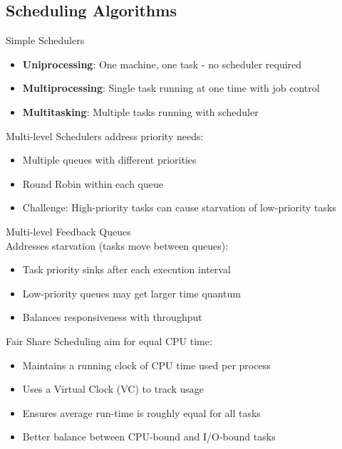\multend

\subsection{Scheduling Algorithms}


\begin{definition}{Simple Schedulers}
    \begin{itemize}
        \item \textbf{Uniprocessing}: One machine, one task - no scheduler required
        \item \textbf{Multiprocessing}: Single task running at one time with job control
        \item \textbf{Multitasking}: Multiple tasks running with scheduler
    \end{itemize}
\end{definition}

\begin{concept}{Multi-level Schedulers} address priority needs:
    \begin{itemize}
        \item Multiple queues with different priorities
        \item Round Robin within each queue
        \item Challenge: High-priority tasks can cause starvation of low-priority tasks
    \end{itemize}
\end{concept}

\begin{concept}{Multi-level Feedback Queues} \\
    Addresses starvation (tasks move between queues):
    \begin{itemize}
        \item Task priority sinks after each execution interval
        \item Low-priority queues may get larger time quantum
        \item Balances responsiveness with throughput
    \end{itemize}
\end{concept}

\begin{concept}{Fair Share Scheduling} aim for equal CPU time:
    \begin{itemize}
        \item Maintains a running clock of CPU time used per process
        \item Uses a Virtual Clock (VC) to track usage
        \item Ensures average run-time is roughly equal for all tasks
        \item Better balance between CPU-bound and I/O-bound tasks
    \end{itemize}
\end{concept}

